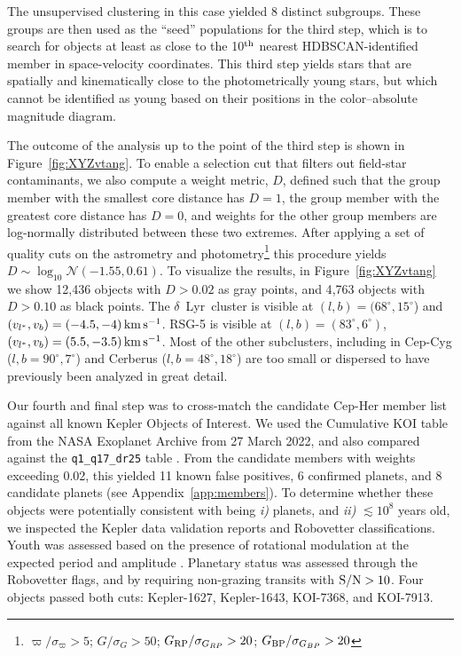 \documentclass[12pt,twocolumn,tighten,linenumbers,trackchanges]{aastex63}
\newcommand{\mkms}{{\rm \,km\,s^{-1}}}  %
\begin{document}
The unsupervised clustering in this case yielded 8 distinct subgroups.
These groups are then used as the ``seed'' populations for the third
step, which is to search for objects at least as close to the 10$^{\rm
th}$ nearest HDBSCAN-identified member in space-velocity coordinates.
This third step yields stars that are spatially and kinematically
close to the photometrically young stars, but which cannot be
identified as young based on their positions in the color--absolute
magnitude diagram.

The outcome of the analysis up to the point of the third step is shown
in Figure~\ref{fig:XYZvtang}.  To enable a selection cut that filters
out field-star contaminants, we also compute a weight metric,
$D$, defined such that the group member with the smallest core
distance has $D=1$, the group member with the greatest core
distance has $D=0$, and weights for the other group members are
log-normally distributed between these two extremes.  After applying a
set of quality cuts on the astrometry and
photometry\footnote{$\varpi/\sigma_\varpi>5$; $G/\sigma_{G}>50$;
$G_{\rm RP}/\sigma_{G_{RP}}>20$; $G_{\rm BP}/\sigma_{G_{BP}}>20$}
this procedure yields $D \sim \log_{10}\mathcal{N}(-1.55,0.61)$.
To visualize the results, in Figure~\ref{fig:XYZvtang} we show
12{,}436 objects with $D>0.02$ as gray points, and 
4{,}763 objects with $D>0.10$ as black points.  The 
$\delta$~Lyr\ cluster is visible at $(l,b)=(68^\circ,15^\circ$)
and $(v_{l^*}, v_b)=(-4.5 ,-4 )\mkms$.  RSG-5 is visible at
$(l,b)=(83^\circ,6^\circ)$, $(v_{l^*}, v_b)=(5.5 ,-3.5 )\mkms$.  Most
of the other subclusters, including in Cep-Cyg
($l,b=90^\circ,7^\circ$) and Cerberus ($l,b=48^\circ,18^\circ$) are
too small or dispersed to have previously been analyzed in great
detail.

%
%
Our fourth and final step was to cross-match the candidate Cep-Her
member list against all known Kepler Objects of Interest.  We used the
Cumulative KOI table from the NASA Exoplanet Archive from 27 March
2022, and also compared against the \texttt{q1\_q17\_dr25} table
\citep{thompson_planetary_2018}.  From the candidate members with
weights exceeding 0.02, this yielded 11 known false positives, 6
confirmed planets, and 8 candidate planets (see Appendix~\ref{app:members}).
To determine whether these objects were
potentially consistent with being {\it i)} planets, and {\it ii)}
$\lesssim 10^8$ years old, we inspected the Kepler data validation
reports and Robovetter classifications.  Youth was assessed based on
the presence of rotational modulation at the expected period and
amplitude \citep[{e.g.},][]{rebull_rotation_2020}. 
Planetary status was assessed through the Robovetter flags, and by
requiring non-grazing transits with ${\rm S/N}>10$.
Four objects passed both cuts: Kepler-1627, Kepler-1643, KOI-7368, and
KOI-7913.
\end{document}
